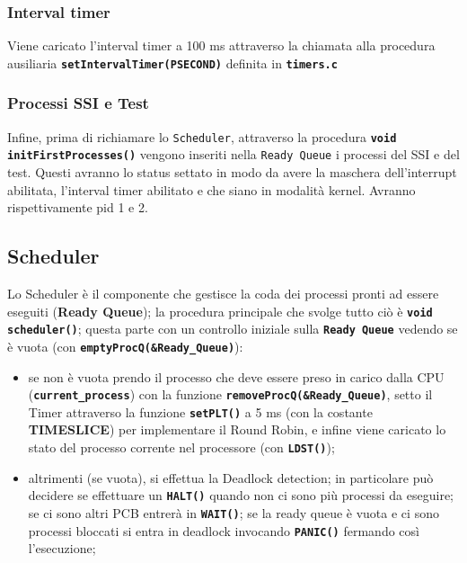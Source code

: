 \documentclass{article}
\begin{document}
\subsubsection{Interval timer}
Viene caricato l'interval timer a 100 ms attraverso la chiamata alla procedura ausiliaria \texttt{\textbf{setIntervalTimer(PSECOND)}} definita in \texttt{\textbf{timers.c}}

\newpage

\subsubsection{Processi SSI e Test}
Infine, prima di richiamare lo \texttt{Scheduler}, attraverso la procedura \texttt{\textbf{void initFirstProcesses()}} vengono inseriti nella \texttt{Ready Queue} i processi del SSI e del test. Questi avranno lo status settato in modo da avere la maschera dell'interrupt abilitata, l'interval timer abilitato e che siano in modalità kernel. Avranno rispettivamente pid 1 e 2.


\subsection{Scheduler}
Lo Scheduler è il componente che gestisce la coda dei processi pronti ad essere eseguiti (\textbf{Ready Queue}); la procedura principale che svolge tutto ciò è \texttt{\textbf{void scheduler()}}; questa parte con un controllo iniziale sulla \texttt{\textbf{Ready Queue}} vedendo se è vuota (con \texttt{\textbf{emptyProcQ(\&Ready\_Queue)}}):
\begin{itemize}
    \item se non è vuota prendo il processo che deve essere preso in carico dalla CPU (\texttt{\textbf{current\_process}}) con la funzione \texttt{\textbf{removeProcQ(\&Ready\_Queue)}}, setto il Timer attraverso la funzione \texttt{\textbf{setPLT()}} a 5 ms (con la costante \textbf{TIMESLICE}) per implementare il Round Robin, e infine viene caricato lo stato del processo corrente nel processore (con \texttt{\textbf{LDST()}});
    \item altrimenti (se vuota), si effettua la Deadlock detection; in particolare può decidere se effettuare un \texttt{\textbf{HALT()}} quando non ci sono più processi da eseguire; se ci sono altri PCB entrerà in \texttt{\textbf{WAIT()}}; se la ready queue è vuota e ci sono processi bloccati si entra in deadlock invocando \texttt{\textbf{PANIC()}} fermando così l'esecuzione;
\end{itemize}
\end{document}
